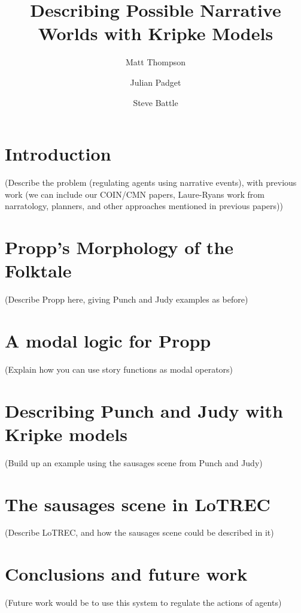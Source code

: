 \documentclass{llncs}
\begin{document}
\title{Describing Possible Narrative Worlds with Kripke Models}


\author{Matt Thompson \and Julian Padget \and Steve Battle }

\maketitle



\begin{abstract}
\end{abstract}

\section{Introduction}
(Describe the problem (regulating agents using narrative events), with previous work (we can include our COIN/CMN papers, Laure-Ryans work from narratology, planners, and other approaches mentioned in previous papers))

\section{Propp's Morphology of the Folktale}
(Describe Propp here, giving Punch and Judy examples as before)

\section{A modal logic for Propp}
(Explain how you can use story functions as modal operators)

\section{Describing Punch and Judy with Kripke models}
(Build up an example using the sausages scene from Punch and Judy)

\section{The sausages scene in LoTREC}
(Describe LoTREC, and how the sausages scene could be described in it)

\section{Conclusions and future work}
(Future work would be to use this system to regulate the actions of agents)


\end{document}
